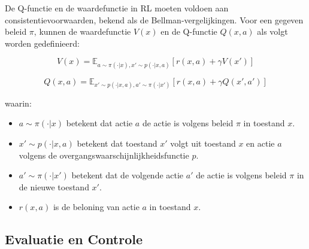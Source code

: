 \documentclass[a4paper,12pt]{report}
\begin{document}
De Q-functie en de waardefunctie in RL moeten voldoen aan
consistentievoorwaarden, bekend als de Bellman-vergelijkingen. Voor een gegeven
beleid \(\pi\), kunnen de waardefunctie \(V(x)\) en de Q-functie \(Q(x,a)\) als
volgt worden gedefinieerd:

\[
    V(x) = \mathbb{E}_{a \sim \pi(\cdot|x), x' \sim p(\cdot|x,a)}[r(x,a) + \gamma V(x')]
\]

\[
    Q(x,a) = \mathbb{E}_{x' \sim p(\cdot|x,a), a' \sim \pi(\cdot|x')}[r(x,a) + \gamma Q(x',a')]
\]

\noindent waarin:
\begin{itemize}
    \item \(a \sim \pi(\cdot|x)\) betekent dat actie \(a\) de actie is volgens beleid \(\pi\) in toestand \(x\).
    \item \(x' \sim p(\cdot|x,a)\) betekent dat toestand \(x'\) volgt uit toestand \(x\) en actie \(a\) volgens de overgangswaarschijnlijkheidsfunctie \(p\).
    \item \(a' \sim \pi(\cdot|x')\) betekent dat de volgende actie \(a'\) de actie is volgens beleid \(\pi\) in de nieuwe toestand \(x'\).
    \item \(r(x,a)\) is de beloning van actie \(a\) in toestand \(x\).
\end{itemize}

\subsection*{Evaluatie en Controle}
\end{document}
